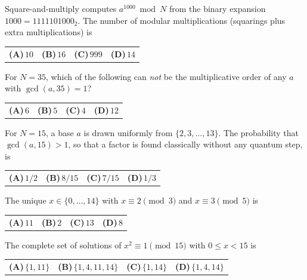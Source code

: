 \documentclass[11pt,a4paper]{article}
\newcommand{\optlabel}[1]{\textbf{(#1)}}
\newenvironment{qitem}[1]{\begin{list}{}{\setlength{\leftmargin}{3.3em}\setlength{\labelwidth}{3.1em}%
  \setlength{\labelsep}{0.2em}\setlength{\topsep}{3pt}\setlength{\parsep}{3pt}}\item[\textbf{Q.#1}\hfill]}{\end{list}}
\newcommand{\qsep}{\par\vspace{2pt}{\color{black!15}\hrule}\vspace{4pt}}
\begin{document}
\begin{qitem}{6}
Square-and-multiply computes $a^{1000} \bmod N$ from the binary expansion $1000 = 1111101000_2$. The number of modular multiplications
(squarings plus extra multiplications) is
\par\smallskip\noindent\begin{tabularx}{\linewidth}{@{}*{4}{L}@{}}
\optlabel{A}\,$10$ & \optlabel{B}\,$16$ & \optlabel{C}\,$999$ & \optlabel{D}\,$14$
\end{tabularx}
\end{qitem}
\qsep

\begin{qitem}{7}
For $N = 35$, which of the following can \emph{not} be the multiplicative order of any $a$ with $\gcd(a, 35) = 1$?
\par\smallskip\noindent\begin{tabularx}{\linewidth}{@{}*{4}{L}@{}}
\optlabel{A}\,$6$ & \optlabel{B}\,$5$ & \optlabel{C}\,$4$ & \optlabel{D}\,$12$
\end{tabularx}
\end{qitem}
\qsep

\begin{qitem}{8}
For $N = 15$, a base $a$ is drawn uniformly from $\{2, 3, \dots, 13\}$. The probability that $\gcd(a, 15) > 1$, so that a factor is found classically
without any quantum step, is
\par\smallskip\noindent\begin{tabularx}{\linewidth}{@{}*{4}{L}@{}}
\optlabel{A}\,$1/2$ & \optlabel{B}\,$8/15$ & \optlabel{C}\,$7/15$ & \optlabel{D}\,$1/3$
\end{tabularx}
\end{qitem}
\qsep

\begin{qitem}{9}
The unique $x \in \{0, \dots, 14\}$ with $x \equiv 2 \pmod 3$ and $x \equiv 3 \pmod 5$ is
\par\smallskip\noindent\begin{tabularx}{\linewidth}{@{}*{4}{L}@{}}
\optlabel{A}\,$11$ & \optlabel{B}\,$2$ & \optlabel{C}\,$13$ & \optlabel{D}\,$8$
\end{tabularx}
\end{qitem}
\qsep

\begin{qitem}{10}
The complete set of solutions of $x^2 \equiv 1 \pmod{15}$ with $0 \le x < 15$ is
\par\smallskip\noindent\begin{tabularx}{\linewidth}{@{}*{4}{L}@{}}
\optlabel{A}\,$\{1, 11\}$ & \optlabel{B}\,$\{1, 4, 11, 14\}$ & \optlabel{C}\,$\{1, 14\}$ & \optlabel{D}\,$\{1, 4, 14\}$
\end{tabularx}
\end{qitem}
\qsep
\end{document}
